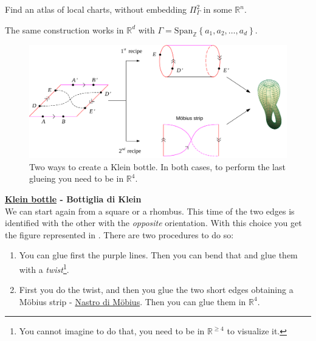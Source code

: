 \documentclass[../main.tex]{subfiles}
\begin{document}
\begin{exercise}
Find an atlas of local charts, without embedding $\Pi^2_{\Gamma}$ in some $\mathbb{R}^n$.
\end{exercise}
\begin{kaobox}[frametitle=Remark]
The same construction works in $\mathbb{R}^d$ with \(
\Gamma=\textrm{Span}_{\mathbb{Z}}\left\{a_1,a_2,\dots,a_d\right\}
\).
\end{kaobox}
\begin{figure}[h!]
	\includegraphics{images/klein_bottle.pdf}
	\caption[How to construct a Klein Bottle]{Two ways to create a Klein bottle. In both cases, to perform the last glueing you need to be in $\mathbb{R}^4$.}
\end{figure}
\begin{example}
\textbf{\href{https://it.wikipedia.org/wiki/Bottiglia_di_Klein}{Klein bottle} - Bottiglia di Klein}\\
We can start again from a square or a rhombus. This time of the two edges is identified with the other with the \textit{opposite} orientation. With this choice you get the figure represented in . There are two procedures to do so:
\begin{enumerate}
    \item You can glue first the purple lines. Then you can bend that and glue them with a \textit{twist}\footnote{You cannot imagine to do that, you need to be in $\mathbb{R}^{\geq 4}$ to visualize it.}.
    \item First you do the twist, and then you glue the two short edges obtaining a Möbius strip - \href{https://it.wikipedia.org/wiki/Nastro_di_M\%C3\%B6bius}{Nastro di Möbius}. Then you can glue them in $\mathbb{R}^4$.
\end{enumerate}
\end{example}
\end{document}
